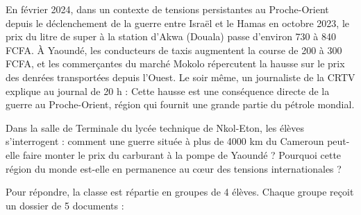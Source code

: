 \documentclass[11pt]{article}
\begin{document}
En février 2024, dans un contexte de tensions persistantes au Proche-Orient depuis le déclenchement de la guerre entre Israël et le Hamas en octobre 2023, le prix du litre de super à la station d'Akwa (Douala) passe d'environ \num{730} à \num{840} FCFA. À Yaoundé, les conducteurs de taxis augmentent la course de 200 à 300 FCFA, et les commerçantes du marché Mokolo répercutent la hausse sur le prix des denrées transportées depuis l'Ouest. Le soir même, un journaliste de la CRTV explique au journal de 20 h : \og Cette hausse est une conséquence directe de la guerre au Proche-Orient, région qui fournit une grande partie du pétrole mondial. \fg{}

Dans la salle de Terminale du lycée technique de Nkol-Eton, les élèves s'interrogent : comment une guerre située à plus de \num{4000} km du Cameroun peut-elle faire monter le prix du carburant à la pompe de Yaoundé ? Pourquoi cette région du monde est-elle en permanence au cœur des tensions internationales ?

Pour répondre, la classe est répartie en groupes de 4 élèves. Chaque groupe reçoit un dossier de 5 documents :
\end{document}
